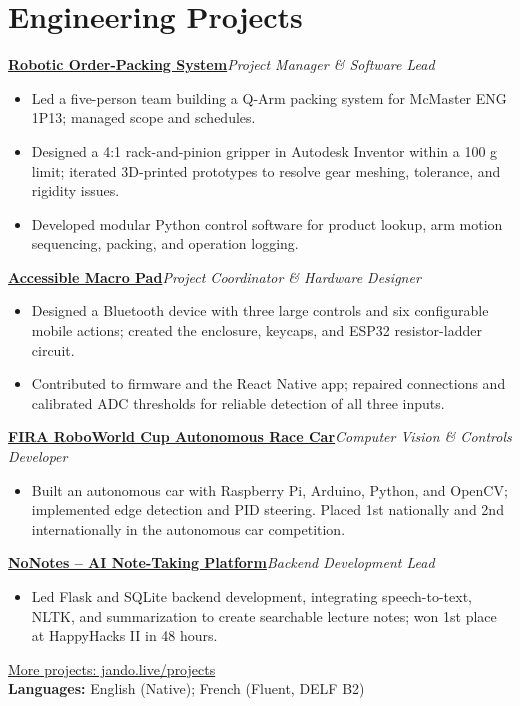 \documentclass[10pt,letterpaper]{article}
\newcommand{\resumeItem}[1]{\item #1}
\newcommand{\resumeProject}[2]{\textbf{#1}\hfill\textit{#2}\par}
\newcommand{\link}[2]{\href{#1}{#2}}
\begin{document}
\section*{Engineering Projects}
\resumeProject{\link{https://jando.live/projects/q-arm}{Robotic Order-Packing System}}{Project Manager \& Software Lead}
\begin{itemize}
\resumeItem{Led a five-person team building a Q-Arm packing system for McMaster ENG 1P13; managed scope and schedules.}
\resumeItem{Designed a 4:1 rack-and-pinion gripper in Autodesk Inventor within a 100 g limit; iterated 3D-printed prototypes to resolve gear meshing, tolerance, and rigidity issues.}
\resumeItem{Developed modular Python control software for product lookup, arm motion sequencing, packing, and operation logging.}
\end{itemize}
\resumeProject{\link{https://jando.live/projects/accessible-macro-pad}{Accessible Macro Pad}}{Project Coordinator \& Hardware Designer}
\begin{itemize}
\resumeItem{Designed a Bluetooth device with three large controls and six configurable mobile actions; created the enclosure, keycaps, and ESP32 resistor-ladder circuit.}
\resumeItem{Contributed to firmware and the React Native app; repaired connections and calibrated ADC thresholds for reliable detection of all three inputs.}
\end{itemize}
\resumeProject{\link{https://jando.live/projects/fira-race-car}{FIRA RoboWorld Cup Autonomous Race Car}}{Computer Vision \& Controls Developer}
\begin{itemize}
\resumeItem{Built an autonomous car with Raspberry Pi, Arduino, Python, and OpenCV; implemented edge detection and PID steering. Placed 1st nationally and 2nd internationally in the autonomous car competition.}
\end{itemize}
\resumeProject{\link{https://jando.live/projects/nonotes}{NoNotes -- AI Note-Taking Platform}}{Backend Development Lead}
\begin{itemize}
\resumeItem{Led Flask and SQLite backend development, integrating speech-to-text, NLTK, and summarization to create searchable lecture notes; won 1st place at HappyHacks II in 48 hours.}
\end{itemize}

\vspace{3pt}
\link{https://jando.live/projects}{More projects: jando.live/projects}\\[3pt]
\textbf{Languages:} English (Native); French (Fluent, DELF B2)
\end{document}
